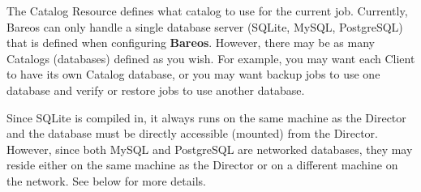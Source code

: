 The Catalog Resource defines what catalog to use for the current job.
Currently, Bareos can only handle a single database server (SQLite, MySQL,
PostgreSQL) that is defined when configuring {\bf Bareos}.  However, there
may be as many Catalogs (databases) defined as you wish.  For example, you
may want each Client to have its own Catalog database, or you may want
backup jobs to use one database and verify or restore jobs to use another
database.

Since SQLite is compiled in, it always runs on the same machine
as the Director and the database must be directly accessible (mounted) from
the Director.  However, since both MySQL and PostgreSQL are networked
databases, they may reside either on the same machine as the Director
or on a different machine on the network.  See below for more details.



